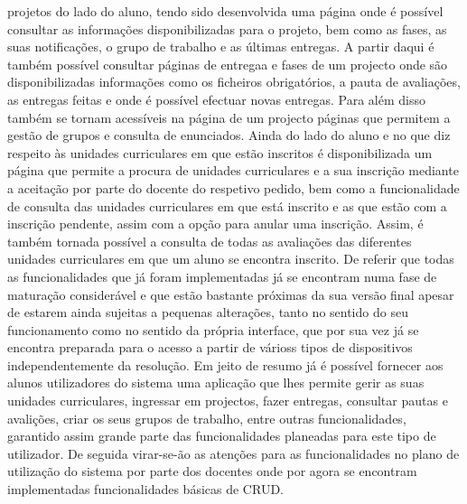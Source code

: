  projetos do lado do aluno, tendo sido desenvolvida uma página onde é possível 
 consultar as informações disponibilizadas para o projeto, bem como as fases, as 
 suas notificações, o grupo de trabalho e as últimas entregas. A partir daqui é 
 também possível consultar páginas de entregaa e fases de um projecto onde são 
 disponibilizadas informações como os ficheiros obrigatórios, a pauta de 
 avaliações, as entregas feitas e onde é possível efectuar novas entregas.
 Para além disso também se tornam acessíveis na página de um projecto páginas 
 que permitem a gestão de grupos e consulta de enunciados.
 Ainda do lado do aluno e no que diz respeito às unidades curriculares em que 
 estão inscritos é disponibilizada um página que permite a procura de unidades 
 curriculares e a sua inscrição mediante a aceitação por parte do docente do 
 respetivo pedido, bem como a funcionalidade de consulta das unidades 
 curriculares em que está inscrito e as que estão com a inscrição pendente, 
 assim com a opção para anular uma inscrição.
 Assim, é também tornada possível a consulta de todas as avaliações das 
 diferentes unidades curriculares em que um aluno se encontra inscrito.
 De referir que todas as funcionalidades que já foram implementadas já se 
 encontram numa fase de maturação considerável e que estão bastante próximas da sua 
 versão final apesar de estarem ainda sujeitas a pequenas alterações, tanto no sentido 
 do seu funcionamento como no sentido da própria interface, que por sua vez já se encontra preparada 
 para o acesso a partir de várioss tipos de dispositivos independentemente da resolução.
Em jeito de resumo já é possível fornecer aos alunos utilizadores do sistema uma 
aplicação que lhes permite gerir as suas unidades curriculares, ingressar em 
projectos, fazer entregas, consultar pautas e avalições, criar os seus grupos de trabalho, entre outras 
funcionalidades, garantido assim grande parte das funcionalidades planeadas para este tipo de 
utilizador. De seguida virar-se-ão as atenções para as funcionalidades no plano 
de utilização do sistema por parte dos docentes onde por agora se encontram 
implementadas funcionalidades básicas de CRUD.
\newpage
